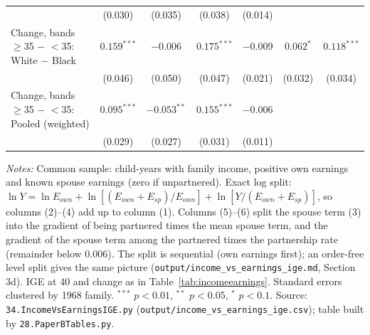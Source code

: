 \begin{table}[!htbp]
{{\begin{tabular}{lcccccc}
 & (0.030) & (0.035) & (0.038) & (0.014) &  &  \\
Change, bands $\geq$35 $-$ $<$35: White $-$ Black & $0.159^{***}$ & $-0.006$ & $0.175^{***}$ & $-0.009$ & $0.062^{*}$ & $0.118^{***}$ \\
 & (0.046) & (0.050) & (0.047) & (0.021) & (0.032) & (0.034) \\
Change, bands $\geq$35 $-$ $<$35: Pooled (weighted) & $0.095^{***}$ & $-0.053^{**}$ & $0.155^{***}$ & $-0.006$ &  &  \\
 & (0.029) & (0.027) & (0.031) & (0.011) &  &  \\
\bottomrule
\end{tabular}}}
\par\smallskip
\begin{minipage}{\textwidth}\footnotesize \textit{Notes:} Common sample: child-years with family income, positive own earnings and known spouse earnings (zero if unpartnered). Exact log split: $\ln Y=\ln E_{own}+\ln[(E_{own}+E_{sp})/E_{own}]+\ln[Y/(E_{own}+E_{sp})]$, so columns (2)--(4) add up to column (1). Columns (5)--(6) split the spouse term (3) into the gradient of being partnered times the mean spouse term, and the gradient of the spouse term among the partnered times the partnership rate (remainder below 0.006). The split is sequential (own earnings first); an order-free level split gives the same picture (\texttt{output/income\_vs\_earnings\_ige.md}, Section 3d). IGE at 40 and change as in Table~\ref{tab:incomeearnings}. Standard errors clustered by 1968 family. $^{***}$ $p<0.01$, $^{**}$ $p<0.05$, $^{*}$ $p<0.1$. Source: \texttt{34.IncomeVsEarningsIGE.py} (\texttt{output/income\_vs\_earnings\_ige.csv}); table built by \texttt{28.PaperBTables.py}.\end{minipage}
\end{table}
